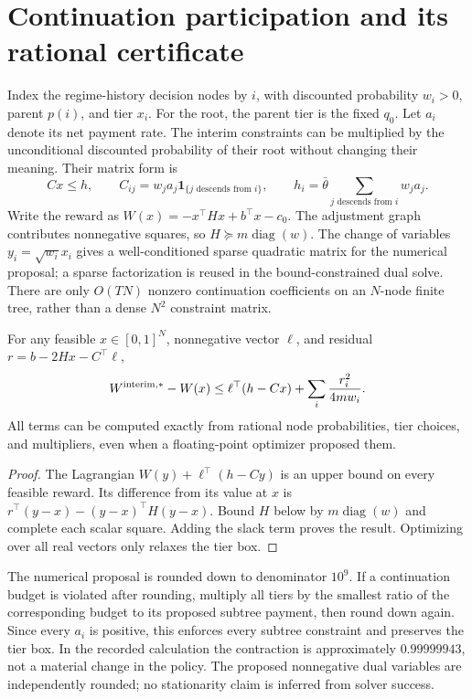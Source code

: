 \section{Continuation participation and its rational certificate}\label{ec:interim-certificate}
Index the regime-history decision nodes by $i$, with discounted probability $w_i>0$, parent $p(i)$, and tier $x_i$. For the root, the parent tier is the fixed $q_0$. Let $a_i$ denote its net payment rate. The interim constraints can be multiplied by the unconditional discounted probability of their root without changing their meaning. Their matrix form is
\[
 Cx\leq h,\qquad C_{ij}=w_ja_j\mathbf1_{\{j\text{ descends from }i\}},
 \qquad h_i=\bar\theta\sum_{j\text{ descends from }i}w_ja_j.
\]
Write the reward as $W(x)=-x^\top Hx+b^\top x-c_0$. The adjustment graph contributes nonnegative squares, so $H\succeq m\operatorname{diag}(w)$. The change of variables $y_i=\sqrt{w_i}x_i$ gives a well-conditioned sparse quadratic matrix for the numerical proposal; a sparse factorization is reused in the bound-constrained dual solve. There are only $O(TN)$ nonzero continuation coefficients on an $N$-node finite tree, rather than a dense $N^2$ constraint matrix.

\begin{proposition}\label{prop:interim-bound}
For any feasible $x\in[0,1]^N$, nonnegative vector $\ell$, and residual $r=b-2Hx-C^\top\ell$,
\[
 W^{\rm interim,*}-W(x)\leq
 \ell^\top(h-Cx)+\sum_i\frac{r_i^2}{4mw_i}.
\]
All terms can be computed exactly from rational node probabilities, tier choices, and multipliers, even when a floating-point optimizer proposed them.
\end{proposition}
\begin{proof}
The Lagrangian $W(y)+\ell^\top(h-Cy)$ is an upper bound on every feasible reward. Its difference from its value at $x$ is $r^\top(y-x)-(y-x)^\top H(y-x)$. Bound $H$ below by $m\operatorname{diag}(w)$ and complete each scalar square. Adding the slack term proves the result. Optimizing over all real vectors only relaxes the tier box.
\end{proof}
The numerical proposal is rounded down to denominator $10^9$. If a continuation budget is violated after rounding, multiply all tiers by the smallest ratio of the corresponding budget to its proposed subtree payment, then round down again. Since every $a_i$ is positive, this enforces every subtree constraint and preserves the tier box. In the recorded calculation the contraction is approximately $0.99999943$, not a material change in the policy. The proposed nonnegative dual variables are independently rounded; no stationarity claim is inferred from solver success.


